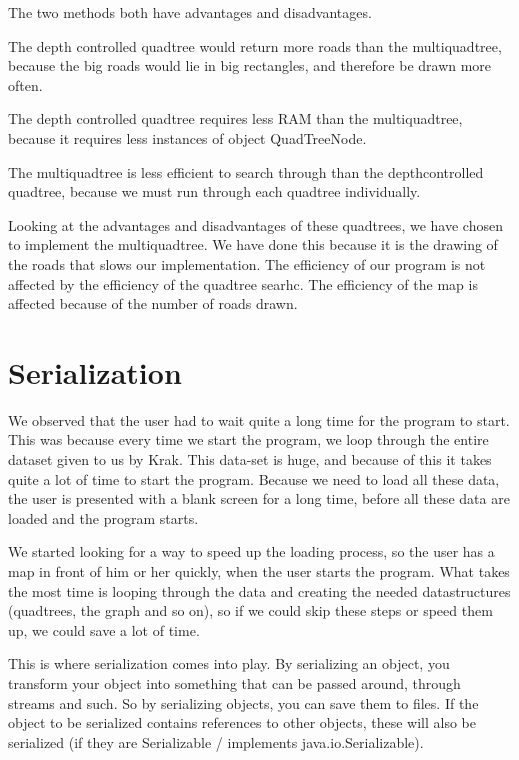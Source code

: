 The two methods both have advantages and disadvantages.

The depth controlled quadtree would return more roads than the multiquadtree,
because the big roads would lie in big rectangles, and therefore be drawn more
often. 

The depth controlled quadtree requires less RAM than the multiquadtree, 
because it requires less instances of object QuadTreeNode.

The multiquadtree is less efficient to search through than the
depthcontrolled quadtree, because we must run through each quadtree
individually.

Looking at the advantages and disadvantages of these quadtrees, we have chosen
to implement the multiquadtree. We have done this because it is the drawing of
the roads that slows our implementation. The efficiency of our program is not
affected by the efficiency of the quadtree searhc. The efficiency of the map is
affected because of the number of roads drawn.

\section{Serialization}
\label{IMPL-SERI}
We observed that the user had to wait quite a long time for the program to start. This 
was because every time we start the program, we loop through the entire dataset given 
to us by Krak. This data-set is huge, and because of this it takes quite a lot of time to 
start the program. Because we need to load all these data, the user is presented with 
a blank screen for a long time, before all these data are loaded and the program starts.

We started looking for a way to speed up the loading process, so the user has a map in 
front of him or her quickly, when the user starts the program. What takes the most time 
is looping through the data and creating the needed datastructures (quadtrees, the 
graph and so on), so if we could skip these steps or speed them up, we could save a lot 
of time.

This is where serialization comes into play. By serializing an object, you transform your 
object into something that can be passed around, through streams and such. So by 
serializing objects, you can save them to files. If the object to be serialized contains 
references to other objects, these will also be serialized (if they are Serializable / 
implements java.io.Serializable).

